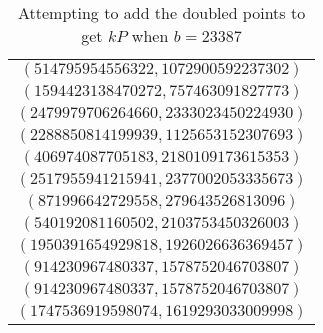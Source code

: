 \begin{table}[htbp]
	\centering
	\begin{tabular}{c}
		$(514795954556322, 1072900592237302)$\\
		$(1594423138470272, 757463091827773)$\\
		$(2479979706264660, 2333023450224930)$\\
		$(2288850814199939, 1125653152307693)$\\
		$(406974087705183, 2180109173615353)$\\
		$(2517955941215941, 2377002053335673)$\\
		$(871996642729558, 279643526813096)$\\
		$(540192081160502, 2103753450326003)$\\
		$(1950391654929818, 1926026636369457)$\\
		$(914230967480337, 1578752046703807)$\\
		$(914230967480337, 1578752046703807)$\\
		$(1747536919598074, 1619293033009998)$
	\end{tabular}
	\label{successfuladd}
	\caption{Attempting to add the doubled points to get $kP$ when $b=23387$}
\end{table}
